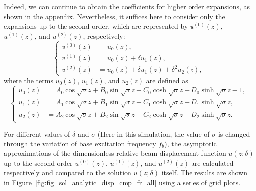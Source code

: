 \documentclass{svjour3}                     %
\begin{document}
Indeed, we can continue to obtain the coefficients for higher order expansions, as shown in the appendix. Nevertheless, it suffices here to consider only the expansions up to the second order, which are represented by $u^{(0)} (z)$, $u^{(1)} (z)$, and $u^{(2)} (z)$, respectively:
\begin{equation}
    \left\{\begin{aligned}
        u^{(0)} (z) &= u_0 (z), \\
        u^{(1)} (z) &= u_0 (z) + \delta u_1(z), \\
        u^{(2)} (z) &= u_0 (z) + \delta u_1(z) + \delta^2 u_2 (z),
    \end{aligned}\right.
\end{equation}
where the terms $u_0 (z)$, $u_1(z)$, and $u_2 (z)$ are defined as
\begin{equation}
    \left\{\begin{aligned}
        u_0 (z) &= A_0 \cos{\sqrt{\sigma}z} + B_0 \sin{\sqrt{\sigma}z} + C_0 \cosh{\sqrt{\sigma}z} + D_0 \sinh{\sqrt{\sigma}z} - 1, \\
        u_1 (z) &= A_1 \cos{\sqrt{\sigma}z} + B_1 \sin{\sqrt{\sigma}z} + C_1 \cosh{\sqrt{\sigma}z} + D_1 \sinh{\sqrt{\sigma}z}, \\
        u_2 (z) &= A_2 \cos{\sqrt{\sigma}z} + B_2 \sin{\sqrt{\sigma}z} + C_2 \cosh{\sqrt{\sigma}z} + D_2 \sinh{\sqrt{\sigma}z}.
    \end{aligned}\right.
\end{equation}

For different values of $\delta$ and $\sigma$ (Here in this simulation, the value of $\sigma$ is changed through the variation of base excitation frequency $f_b$), the asymptotic approximations of the dimensionless relative beam displacement function $u(z;\delta)$ up to the second order $u^{(0)}(z)$, $u^{(1)}(z)$, and $u^{(2)}(z)$ are calculated respectively and compared to the solution $u(z;\delta)$ itself. The results are shown in Figure~\ref{fig:fig_sol_analytic_disp_cmp_fr_all} using a series of grid plots. 
\end{document}
